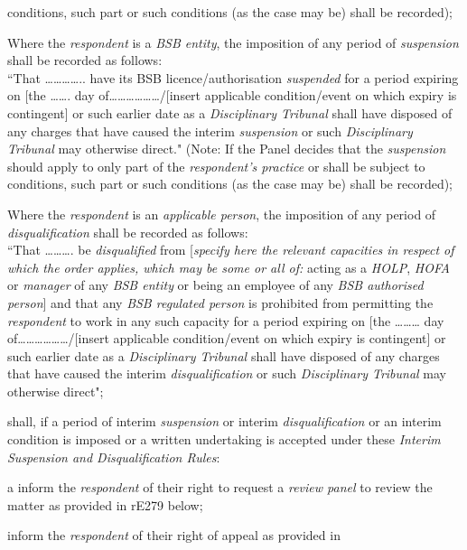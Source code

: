 conditions, such part or such conditions (as the case may be) shall be
recorded);\\
\item  Where the \emph{respondent }is a \emph{BSB entity}, the imposition of
any period of \emph{suspension} shall be recorded as follows:\\
``That \ldots\ldots\ldots\ldots.. have its BSB
licence/authorisation \emph{suspended} for a period expiring on {[}the
\ldots\ldots. day of\ldots\ldots\ldots\ldots\ldots\ldots/{[}insert
applicable condition/event on which expiry is contingent{]} or such
earlier date as a \emph{Disciplinary Tribunal} shall have disposed of
any charges that have caused the interim \emph{suspension} or
such \emph{Disciplinary Tribunal} may otherwise direct." (Note: If the
Panel decides that the \emph{suspension} should apply to only part of
the \emph{respondent's practice} or shall be subject to conditions, such
part or such conditions (as the case may be) shall be recorded);\\
\item  Where the \emph{respondent }is an \emph{applicable person}, the
imposition of any period of \emph{disqualification} shall be recorded as
follows:\\
``That \ldots\ldots\ldots. be \emph{disqualified} from {[}\emph{specify
here the relevant capacities in respect of which the order applies,
which may be some or all of: }acting as
a \emph{HOLP}, \emph{HOFA} or \emph{manager} of any \emph{BSB entity} or
being an employee of any \emph{BSB authorised person}{]} and that
any \emph{BSB regulated person} is prohibited from permitting
the \emph{respondent }to work in any such capacity for a period expiring
on {[}the \ldots\ldots\ldots{} day
of\ldots\ldots\ldots\ldots\ldots\ldots/{[}insert applicable
condition/event on which expiry is contingent{]} or such earlier date as
a \emph{Disciplinary Tribunal} shall have disposed of any charges that
have caused the interim \emph{disqualification} or
such \emph{Disciplinary Tribunal} may otherwise direct";\la \item shall, if a period of interim \emph{suspension} or
interim \emph{disqualification} or an interim condition is imposed or a
written undertaking is accepted under these \emph{Interim Suspension and
Disqualification Rules}:\al \item a inform the \emph{respondent} of their right to request a \emph{review
panel} to review the matter as provided in rE279 below;\\
\item  inform the \emph{respondent} of their right of appeal as provided in
